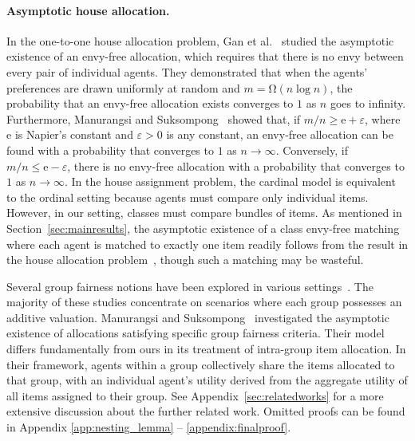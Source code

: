 \paragraph{Asymptotic house allocation.}
In the one-to-one house allocation problem, Gan et al.~\cite{GanSuksompongVoudouris2019} studied the asymptotic existence of an envy-free allocation, which requires that there is no envy between every pair of individual agents. 
They demonstrated that when the agents' preferences are drawn uniformly at random and $m=\mathrm{\Omega}(n\log n)$, the probability that an envy-free allocation exists converges to $1$ as $n$ goes to infinity.
Furthermore, Manurangsi and Suksompong~\cite{ManurangsiSuksompong2021} showed that, if $m/n\geq\mathrm{e}+\varepsilon$, where $\mathrm{e}$ is Napier's constant and $\varepsilon>0$ is any constant, an envy-free allocation can be found with a probability that converges to $1$ as $n\to \infty$. Conversely, if $m/n\leq\mathrm{e}-\varepsilon$, there is no envy-free allocation with a probability that converges to $1$ as $n\to \infty$. 
In the house assignment problem, the cardinal model is equivalent to the ordinal setting because agents must compare only individual items. However, in our setting, classes must compare bundles of items. 
As mentioned in Section~\ref{sec:mainresults}, the asymptotic existence of a class envy-free matching where each agent is matched to exactly one item readily follows from the result in the house allocation problem~\cite{GanSuksompongVoudouris2019,ManurangsiSuksompong2021}, though such a matching may be wasteful. 



Several group fairness notions have been explored in various settings~\cite{KyropoulouSuksompongVoudouris2020,ManurangsiSuksompong2017,ManurangsiSuksompong_group_2022,SegalSuksompong2019}. 
The majority of these studies concentrate on scenarios where each group possesses an additive valuation.
%
Manurangsi and Suksompong~\cite{ManurangsiSuksompong2017} investigated the asymptotic existence of allocations satisfying specific group fairness criteria. Their model differs fundamentally from ours in its treatment of intra-group item allocation. 
In their framework, agents within a group collectively share the items allocated to that group, with an individual agent's utility derived from the aggregate utility of all items assigned to their group. See Appendix~\ref{sec:relatedworks} for a more extensive discussion about the further related work. Omitted proofs can be found in Appendix \ref{app:nesting_lemma} -- \ref{appendix:finalproof}. 
\fi



